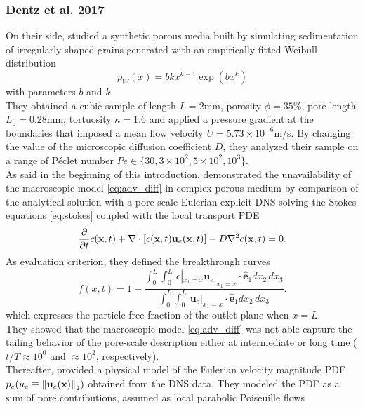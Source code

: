 \subsubsection{Dentz et al. 2017}
On their side, \citet{Dentz2017} studied a synthetic porous media built by simulating sedimentation of irregularly shaped grains generated with an empirically fitted Weibull distribution
\begin{equation}\label{eq:weibull}
	p_W(x)=bkx^{k-1}\exp(bx^k)
\end{equation}
with parameters $b$ and $k$.\\
They obtained a cubic sample of length $L=2$mm, porosity $\phi=35\%$, pore length $L_0=0.28$mm, tortuosity $\kappa=1.6$ and applied a pressure gradient at the boundaries that imposed a mean flow velocity $U=5.73\times 10^{-6}$m/s. By changing the value of the microscopic diffusion coefficient $D$, they analyzed their sample on a range of Péclet number $Pe\in\{30, 3\times 10^2, 5\times 10^2, 10^3\}$.\\
As said in the beginning of this introduction, \citeauthor{Dentz2017} demonstrated the unavailability of the macroscopic model \eqref{eq:adv_diff} in complex porous medium by comparison of the analytical solution with a pore-scale Eulerian explicit DNS solving the Stokes equations \eqref{eq:stokes} coupled with the local transport PDE
\begin{equation}\label{eq:micro_adv_diff}
\pdv{t}c(\textbf{x},t)+\nabla\cdot[c(\textbf{x},t)\textbf{u}_e(\textbf{x},t)]-D \nabla^2c(\textbf{x},t)=0.
\end{equation}
As evaluation criterion, they defined the breakthrough curves
\begin{equation}
f(x,t)=1-\frac{\int_0^L\int_0^L\,c|_{x_1=x}\textbf{u}_e|_{x_1=x}\cdot \hat{\textbf{e}}_1 dx_2\,dx_3}{\int_0^L\int_0^L\,\textbf{u}_e|_{x_1=x}\cdot \hat{\textbf{e}}_1dx_2\,dx_3}.
\label{eq:DentzBTC}
\end{equation}
which expresses the particle-free fraction of the outlet plane when $x=L$.\\
They showed that the macroscopic model \eqref{eq:adv_diff} was not able capture the tailing behavior of the pore-scale description either at intermediate or long time ($t/T\approx 10^0$ and $\approx 10^2$, respectively).\\
Thereafter, \citeauthor{Dentz2017} provided a physical model of the Eulerian velocity magnitude PDF $p_e(u_e\equiv\norm{\textbf{u}_e(\textbf{x})}_2)$  obtained from the DNS data. 
They modeled the PDF as a sum of pore contributions, assumed as local parabolic Poiseuille flows 
